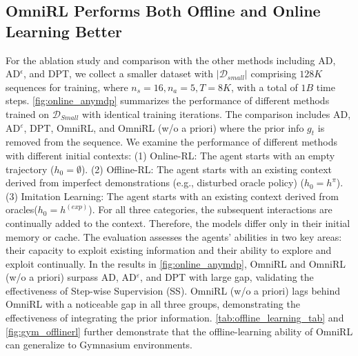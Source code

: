 \documentclass{article}
\begin{document}
\subsection{OmniRL Performs Both Offline and Online Learning Better}\label{sec:results_base}
For the ablation study and comparison with the other methods including AD, AD$^\epsilon$, and DPT, we collect a smaller dataset with $|\mathcal{D}_{small}|$ comprising $128K$ sequences for training, where $n_s=16, n_a=5, T=8K$, with a total of $1B$ time steps. \cref{fig:online_anymdp} summarizes the performance of different methods trained on $\mathcal{D}_{Small}$ with identical training iterations. The comparison includes AD, AD$^{\varepsilon}$, DPT, OmniRL, and OmniRL (w/o a priori) where the prior info $g_t$ is removed from the sequence.
We examine the performance of different methods with different initial contexts: (1) Online-RL: The agent starts with an empty trajectory ($h_{0} = \emptyset$). (2) Offline-RL: The agent starts with an existing context derived from imperfect demonstrations (e.g., disturbed oracle policy) ($h_{0} = h^{\pi}$). (3) Imitation Learning: The agent starts with an existing context derived from oracles($h_{0} = h^{(exp)}$).
For all three categories, the subsequent interactions are continually added to the context. Therefore, the models differ only in their initial memory or cache. The evaluation assesses the agents' abilities in two key areas: their capacity to exploit existing information and their ability to explore and exploit continually. In the results in \cref{fig:online_anymdp}, OmniRL and OmniRL (w/o a priori) surpass AD, AD$^\varepsilon$, and DPT with large gap, validating the effectiveness of Step-wise Supervision (SS). OmniRL (w/o a priori) lags behind OmniRL with a noticeable gap in all three groups, demonstrating the effectiveness of integrating the prior information. \cref{tab:offline_learning_tab} and \cref{fig:gym_offlinerl} further demonstrate that the offline-learning ability of OmniRL can generalize to Gymnasium environments.
\end{document}
